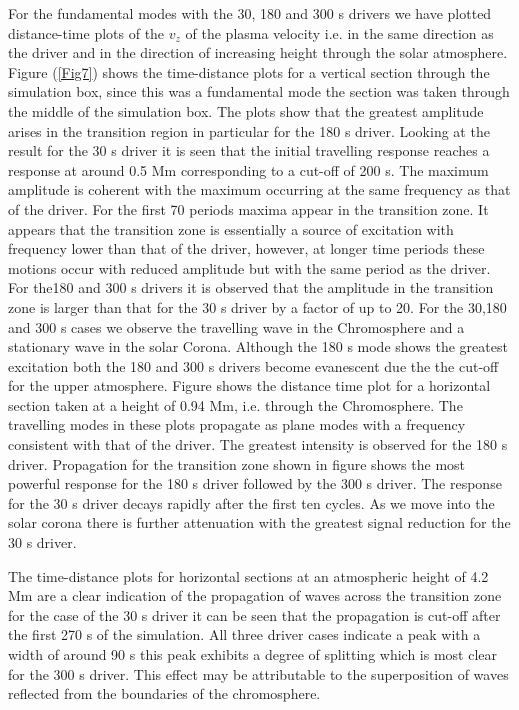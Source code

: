 \documentclass[authoryear,final,1p]{elsarticle}
\begin{document}
For the fundamental modes with the 30, 180 and 300 s drivers we have plotted distance-time plots of the $v_z$ of the plasma velocity i.e. in the same direction as the driver and in the direction of increasing height through the solar atmosphere.  Figure (\ref{Fig7})
 shows the time-distance plots for a vertical section through the simulation box, since this was a fundamental mode the section was taken through the middle of the simulation box. The plots show that the greatest amplitude arises in the transition region in particular for the 180 s driver. Looking at the result for the 30 s driver it is seen that the initial travelling response reaches a response at around 0.5 Mm corresponding to a cut-off of 200 s. The maximum amplitude is coherent with the maximum occurring at the same frequency as that of the driver. For the first 70 periods maxima appear in the transition zone. It appears that the transition zone is essentially a source of excitation with frequency lower than that of the driver, however, at longer time periods these motions occur with reduced amplitude but with the same period as the driver. For the180 and 300 s drivers it is observed that the amplitude in the transition zone is larger than that for the 30 s driver by a factor of up to 20. For the 30,180 and 300 s cases we observe the travelling wave in the Chromosphere and a stationary wave in the solar Corona. Although the 180 s mode shows the greatest excitation both the 180 and 300 s drivers become evanescent due the the cut-off for the upper atmosphere. Figure  shows the distance time plot for a horizontal section taken at a height of 0.94 Mm, i.e. through the Chromosphere. The travelling modes in these plots propagate as plane modes with a frequency consistent with that of the driver. The greatest intensity is observed for the 180 s driver. Propagation for the transition zone shown in figure  shows the most powerful response for the 180 s driver followed by the 300 s driver. The response for the 30 s driver decays rapidly after the first ten cycles. As we move into the solar corona there is further attenuation with the greatest signal reduction for the 30 s driver.

The time-distance plots  for horizontal sections at an atmospheric height of 4.2 Mm are a clear indication of the propagation of waves across the transition zone for the case of the 30 s driver it can be seen that  the propagation is cut-off after the first 270 s of the simulation. All three driver cases indicate a peak with a width of around 90 s this peak exhibits a degree of splitting which is most clear for the 300 s driver.  This effect may be attributable to the superposition of waves reflected from the boundaries of the chromosphere.
\end{document}
